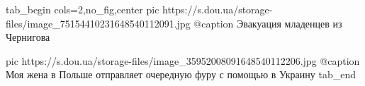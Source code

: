  
 
 
 
 

\ifcmt
  tab_begin cols=2,no_fig,center
     pic https://s.dou.ua/storage-files/image_75154410231648540112091.jpg
		 @caption Эвакуация младенцев из Чернигова
		 
		 pic https://s.dou.ua/storage-files/image_35952008091648540112206.jpg
		 @caption Моя жена в Польше отправляет очередную фуру с помощью в Украину
  tab_end
\fi
